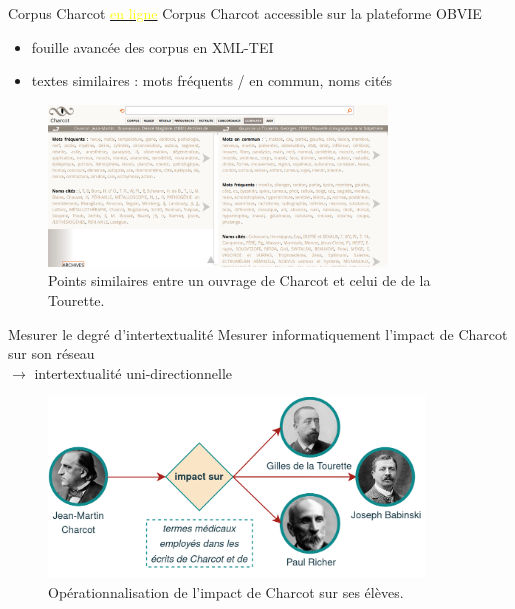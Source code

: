 \begin{frame}{Corpus Charcot \href{https://obtic.huma-num.fr/obvie/charcot/?view=corpus}{\textcolor{yellow}{en ligne}}}
Corpus Charcot accessible sur la plateforme \textsc{OBVIE} \hfill {\small\citep{alrahabi2022obvie}}
\begin{itemize}
\item fouille avancée des corpus en \textsc{XML-TEI}
\item textes similaires : mots fréquents / en commun, noms cités
\end{itemize}
\begin{figure}[!h]
    \centering
\includegraphics[width=90mm,scale=0.5]{pic/doc_sim.png}
    \caption{Points similaires entre un ouvrage de Charcot et celui de de la Tourette.}
    \label{fig:my_label}
\end{figure}
\end{frame}

\begin{frame}{Mesurer le degré d'intertextualité}
Mesurer informatiquement l'impact de Charcot sur son réseau \\$\rightarrow$ intertextualité uni-directionnelle
\begin{figure}[!h]
    \centering
\includegraphics[width=100mm,scale=0.5]{pic/charcot_intertextualite.png}
    \caption{Opérationnalisation de l'impact de Charcot sur ses élèves.}
    \label{fig:my_label}
\end{figure}
\end{frame}

